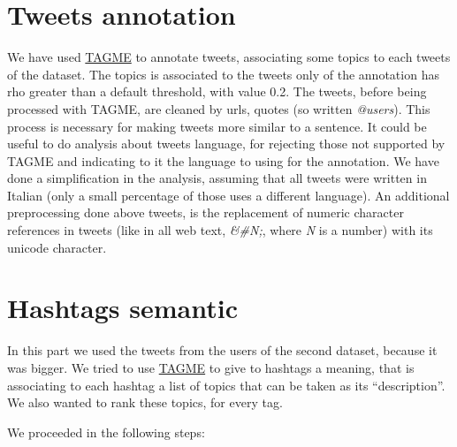 \documentclass[a4paper,11pt,oneside]{article}
\begin{document}
\section{Tweets annotation}
\label{sec:tagme}
We have used \href{http://tagme.di.unipi.it/}{TAGME} to annotate tweets, associating some topics to each tweets of the dataset. The topics is associated to the tweets only of the annotation has rho greater than a default threshold, with value 0.2.
The tweets, before being processed with TAGME, are cleaned by urls, quotes (so written \textit{@users}). This process is necessary for making tweets more similar to a sentence.
It could be useful to do analysis about tweets language, for rejecting those not supported by TAGME and indicating to it the language to using for the annotation.
We have done a simplification in the analysis, assuming that all tweets were written in Italian (only a small percentage of those uses a different language).
An additional preprocessing done above tweets, is the replacement of numeric character references in tweets (like in all web text, \textsl{\&\#N;}, where \textit{N} is a number) with its unicode character.


\section{Hashtags semantic}
\label{sec:hashtags}
In this part we used the tweets from the users of the second dataset, because it was bigger. We tried to use \href{http://tagme.di.unipi.it/}{TAGME} to give to hashtags a meaning, that is associating to each hashtag a list of topics that can be taken as its ``description''. We also wanted to rank these topics, for every tag.

We proceeded in the following steps:
\end{document}
